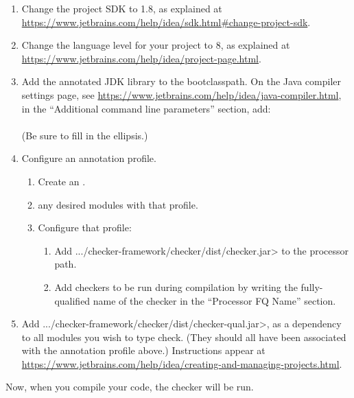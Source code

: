 \begin{enumerate}

\item Change the project SDK to 1.8, as explained at
  \url{https://www.jetbrains.com/help/idea/sdk.html#change-project-sdk}.

\item Change the language level for your project to 8, as explained at
\url{https://www.jetbrains.com/help/idea/project-page.html}.

\item Add the annotated JDK library to the bootclasspath.
On the Java compiler settings page, see \url{https://www.jetbrains.com/help/idea/java-compiler.html},
in the ``Additional command line parameters'' section, add:\\
   \\
(Be sure to fill in the ellipsis.)

\item Configure an annotation profile.
\begin{enumerate}
\item
Create an
.
\item
{}
any desired modules with that profile.
\item
Configure that profile:
\begin{enumerate}
\item Add \<.../checker-framework/checker/dist/checker.jar> to the processor path.
\item Add checkers to be run during compilation by writing the
  fully-qualified name of the checker in the ``Processor FQ Name''
  section.
\end{enumerate}
\end{enumerate}

\item Add \<.../checker-framework/checker/dist/checker-qual.jar>, as a dependency to all
modules you wish to type check. (They should all have been associated with
the annotation profile above.)
Instructions appear at
\url{https://www.jetbrains.com/help/idea/creating-and-managing-projects.html}.

\end{enumerate}

Now, when you compile your code, the checker will be run.


